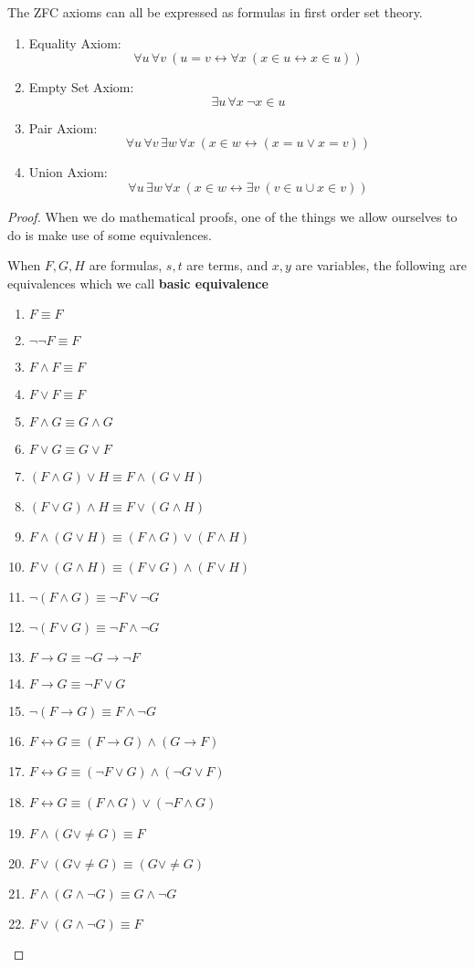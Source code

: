 The ZFC axioms can all be expressed as formulas in first order set theory.
\begin{enumerate}
\item Equality Axiom:
$$\forall u\, \forall v\ (u=v \leftrightarrow \forall x\ (x\in u \leftrightarrow x\in u))$$
\item Empty Set Axiom:
$$\exists u\, \forall x\ \neg x \in u$$
\item Pair Axiom:
$$\forall u\, \forall v\, \exists w\, \forall x\ (x\in w \leftrightarrow (x=u \vee x=v))$$
\item Union Axiom:
$$\forall u\, \exists w\, \forall x\ (x\in w \leftrightarrow \exists v\ (v\in u \cup x\in v))$$
\end{enumerate}


\begin{proof} When we do mathematical proofs, one of the things we allow ourselves to do is make use of some equivalences.

When $F,G,H$ are formulas, $s,t$ are terms, and $x,y$ are variables, the following are equivalences which we call \textbf{basic equivalence}
\begin{enumerate}
\item $F\equiv F$
\item $\neg \neg F\equiv F$
\item $F\wedge F \equiv F$
\item $F\vee F \equiv F$
\item $F\wedge G \equiv G\wedge G$
\item $F\vee G \equiv G\vee F$
\item $(F\wedge G)\vee H \equiv F\wedge (G\vee H)$
\item $(F\vee G)\wedge H \equiv F\vee (G\wedge H)$
\item $F\wedge (G\vee H) \equiv (F\wedge G) \vee (F\wedge H)$
\item $F\vee (G\wedge H) \equiv (F\vee G) \wedge (F\vee H)$
\item $\neg (F\wedge G) \equiv \neg F \vee \neg G$
\item $\neg (F\vee G) \equiv \neg F \wedge \neg G$
\item $F\to G \equiv \neg G\to \neg F$
\item $F\to G \equiv \neg F\vee G$
\item $\neg(F\to G) \equiv F\wedge \neg G$
\item $F\leftrightarrow G \equiv (F\to G)\wedge (G\to F)$
\item $F\leftrightarrow G \equiv (\neg F\vee G) \wedge (\neg G \vee F)$\
\item $F\leftrightarrow G \equiv ( F\wedge G) \vee (\neg F \wedge G)$\
\item $F\wedge (G\vee \neq G) \equiv F$
\item $F\vee (G\vee \neq G) \equiv (G\vee \neq G)$
\item $F\wedge (G\wedge \neg G) \equiv G\wedge \neg G$
\item $F\vee (G\wedge \neg G)\equiv F$
\end{enumerate}
\end{proof}

